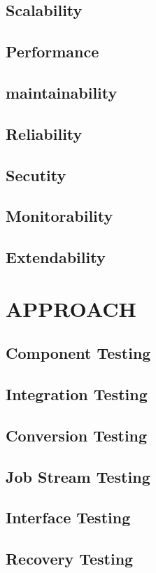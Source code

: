 \documentclass[a4paper,12pt,titlepage,margin=1in]{article}
\begin{document}
	\subsection{Scalability}
	\subsection{Performance}
	\subsection{maintainability}
	\subsection{Reliability}
	\subsection{Secutity}
	\subsection{Monitorability}
	\subsection{Extendability}

\section{APPROACH}
	\subsection{Component Testing}
	\subsection{Integration Testing}
	\subsection{Conversion Testing}
	\subsection{Job Stream Testing}
	\subsection{Interface Testing}

	\subsection{Recovery Testing}
\end{document}
